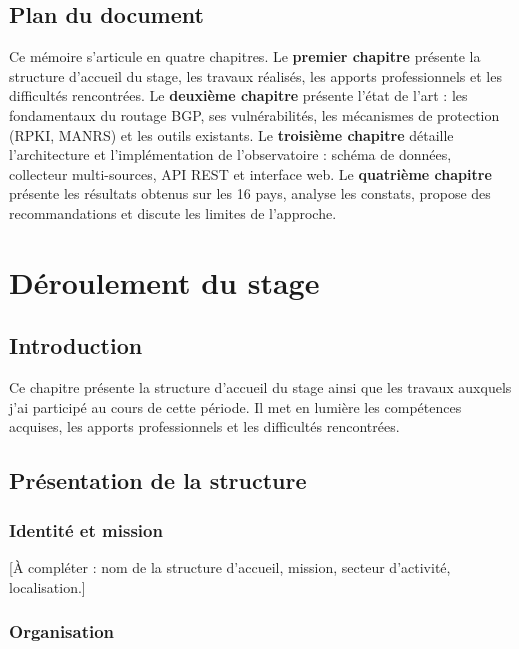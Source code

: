 \documentclass{eneam}
\begin{document}
\section{Plan du document}

Ce mémoire s'articule en quatre chapitres. Le \textbf{premier chapitre} présente la structure d'accueil du stage, les travaux réalisés, les apports professionnels et les difficultés rencontrées. Le \textbf{deuxième chapitre} présente l'état de l'art : les fondamentaux du routage BGP, ses vulnérabilités, les mécanismes de protection (RPKI, MANRS) et les outils existants. Le \textbf{troisième chapitre} détaille l'architecture et l'implémentation de l'observatoire : schéma de données, collecteur multi-sources, API REST et interface web. Le \textbf{quatrième chapitre} présente les résultats obtenus sur les 16 pays, analyse les constats, propose des recommandations et discute les limites de l'approche.


\chapter{Déroulement du stage}

\section{Introduction}

Ce chapitre présente la structure d'accueil du stage ainsi que les travaux auxquels j'ai participé au cours de cette période. Il met en lumière les compétences acquises, les apports professionnels et les difficultés rencontrées.

\section{Présentation de la structure}

\subsection{Identité et mission}

[À compléter : nom de la structure d'accueil, mission, secteur d'activité, localisation.]

\subsection{Organisation}
\end{document}
